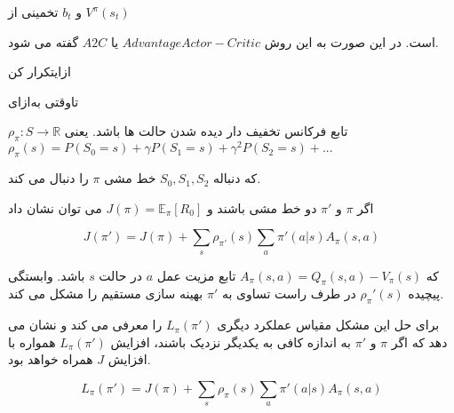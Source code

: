 و $b_t$ تخمینی از 
$V^\pi (s_t)$

است. در این صورت به این روش $Advantage Actor-Critic$ یا $A2C$ گفته می شود.

‌ازای{تکرار کن}



‌تاوقتی
‌به‌ازای
\cite{suttonbook}
 




$\rho_\pi : S \longrightarrow \mathbb{R}$
تابع فرکانس تخفیف دار دیده شدن حالت ها باشد. یعنی
$\rho_\pi(s) = P(S_0=s) + \gamma P(S_1=s) + \gamma^2 P(S_2=s) + ...$

که دنباله
$S_0, S_1, S_2$
خط مشی $\pi$ را دنبال می کند.


اگر $\pi$ و $\pi'$ دو خط مشی باشند و 
$J(\pi) = \mathbb{E}_\pi[R_0]$
 می توان نشان داد
\cite{schulman2015trust}

$$J(\pi')= J(\pi) + \sum_{s} \rho_{\pi'}(s) \sum_{a} \pi'(a|s) A_\pi(s,a)$$

که 
$A_\pi(s,a) = Q_\pi (s,a) - V_\pi(s)$
تابع مزیت عمل $a$ در حالت $s$ باشد.
وابستگی پیچیده 
$\rho_\pi'(s)$
در طرف راست تساوی به $\pi'$ بهینه سازی مستقیم را مشکل می کند.

برای حل این مشکل 
\cite{schulman2015trust}
مقیاس عملکرد دیگری $L_\pi(\pi')$ را معرفی می کند و نشان می دهد که اگر $\pi$ و $\pi'$ به اندازه کافی به یکدیگر نزدیک باشند، افزایش 
$L_\pi(\pi')$
 همواره با افزایش $J$ همراه خواهد بود.

$$L_\pi(\pi')= J(\pi) + \sum_{s} \rho_{\pi}(s) \sum_{a} \pi'(a|s) A_\pi(s,a)$$

